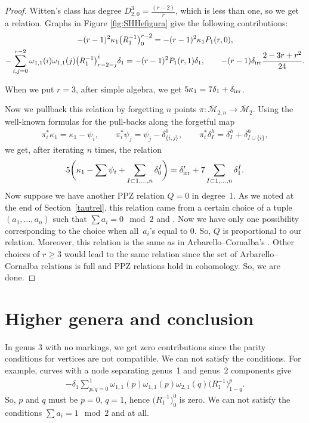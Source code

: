 \documentclass[10pt,a4paper]{amsart}
\def\oM{\overline{\mathcal{M}}}
\numberwithin{equation}{section}
\begin{document}
\begin{proof}
Witten's class has degree
$D^3_{2,0} = \frac{(r-2)}{r}$,
which is less than one, so we get a relation. Graphs in Figure \ref{fig:SHHefigura} give the following contributions:
\begin{gather*}
	-(r-1)^2\kappa_1 \big(R_1^{-1}\big)^{r-2}_0 = -(r-1)^2 \kappa_1 P_1(r,0),
\\
- \sum_{i,j=0}^{r-2}\omega_{1,1}(i)\omega_{1,1}(j)\big(R_1^{-1}\big)^{i}_{r-2-j}\delta_1 = -(r-1)^2 P_1(r,1) \delta_1	,
\qquad
	-(r-1)\delta_{\rm irr} \frac{2-3r+r^2}{24} .
\end{gather*}

When we put $r=3$, after simple algebra, we get
$5\kappa_1 = 7\delta_1 + \delta_{\rm irr}$.

Now we pullback this relation by forgetting $n$ points $\pi\colon \oM_{2,n} \rightarrow \oM_{2}$.
Using the well-known formulas for the pull-backs along the forgetful map
\begin{align*}
 \pi_i^*\kappa_1 = \kappa_1 - \psi_i,\qquad
 \pi_i^*\psi_j = \psi_j - \delta^0_{\{i,j\}},\qquad
 \pi_i^*\delta^h_I = \delta^h_I + \delta^h_{I\cup\{i\}},
\end{align*}
we get, after iterating $n$ times, the relation
\begin{align*}
	5\bigg(\kappa_1 - \sum \psi_i + \sum_{I\subset{1,\dots,n}}\delta_0^{I}\bigg) = \delta_{\rm irr}^{\prime} + 7\sum_{I\subset{1,\dots,n}}\delta_1^{I}.
\end{align*}
 Now suppose we have another PPZ relation $Q=0$ in degree~1. As we noted at the end of Section~\ref{tautrel}, this relation came from a certain choice of a tuple $(a_1,\dots, a_n)$ such that $\sum a_i = 0 \mod 2$ and . Now we have only one possibility corresponding to the choice when all~$a_i$'s equal to 0. So, $Q$ is proportional to our relation. Moreover, this relation is the same as in Arbarello--Cornalba's \cite[Theorem 2.2]{Cor}. Other choices of $r\geq3$ would lead to the same relation since the set of Arbarello--Cornalba relations is full and PPZ relations hold in cohomology. So, we are done.
\end{proof}

\section{Higher genera and conclusion}

In genus 3 with no markings, we get zero contributions since the parity conditions for vertices are not compatible. We can not satisfy the conditions. For example, curves with a node separating genus~1 and genus~2 components give
\begin{align*}
-\delta_1\sum_{p,q=0}^1\omega_{1,1}(p)\omega_{1,1}(p)\omega_{2,1}(q)\big(R_1^{-1}\big)^p_{1-q}.
\end{align*}
So, $p$ and $q$ must be $p=0$, $q=1$, hence $\big(R_1^{-1}\big)^0_{0}$ is zero. We can not satisfy the conditions ${\sum a_i = 1 \mod 2}$ and  at all.
\end{document}
